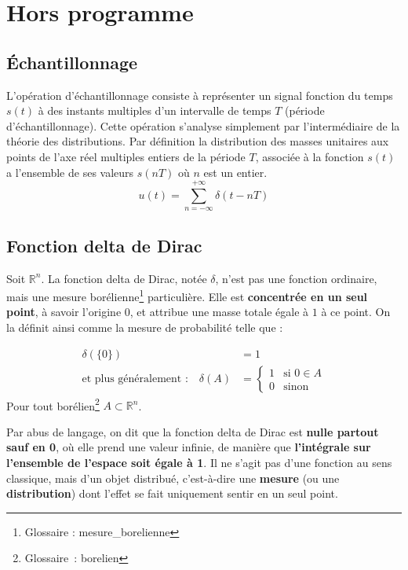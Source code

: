 \chapter{Hors programme}\label{chap:hors-programme}

\section{Échantillonnage}\label{hp:echantillonage}

L’opération d’échantillonnage consiste à représenter un signal fonction du temps 
\(s(t)\) \`a des instants multiples d’un intervalle de temps \(T\) (p\'eriode d’échantillonnage).
Cette op\'eration s'analyse simplement par l’intermédiaire de la th\'eorie des distributions.
Par définition la distribution des masses unitaires aux points de l'axe r\'eel multiples 
entiers de la période \(T\), associée à la fonction \(s(t)\) a l'ensemble de ses valeurs
\(s(nT)\) o\`u \(n\) est un entier.
\[
    u(t) = \sum_{n=-\infty}^{+\infty} \delta(t - nT)
\]

\section{Fonction delta de Dirac}
\label{sec:dirac}

Soit $\mathbb{R}^n$. La fonction delta de Dirac, notée $\delta$, n’est pas 
une fonction ordinaire, mais une mesure borélienne\footnote{Glossaire : \gls{mesure_borelienne}} particulière. Elle est 
\textbf{concentrée en un seul point}, à savoir l’origine $0$, et attribue une 
masse totale égale à $1$ à ce point. On la définit ainsi comme la mesure de 
probabilité telle que :

\begin{align*}
    \delta(\{0\})  &= 1\\
    \text{et plus généralement :} \quad \delta(A) &=
    \begin{cases}
        1 & \text{si } 0 \in A \\
        0 & \text{sinon}
    \end{cases}
\end{align*}
Pour tout borélien\footnote{Glossaire : \gls{borelien}} \(A \subset \mathbb{R}^n\).

Par abus de langage, on dit que la fonction delta de Dirac est 
\textbf{nulle partout sauf en 0}, où elle prend une valeur infinie, de manière que 
\textbf{l’intégrale sur l’ensemble de l’espace soit égale à 1}. Il ne 
s’agit pas d’une fonction au sens classique, mais d’un objet distribué, 
c’est-à-dire une \textbf{mesure} (ou une \textbf{distribution}) dont l’effet se 
fait uniquement sentir en un seul point.

